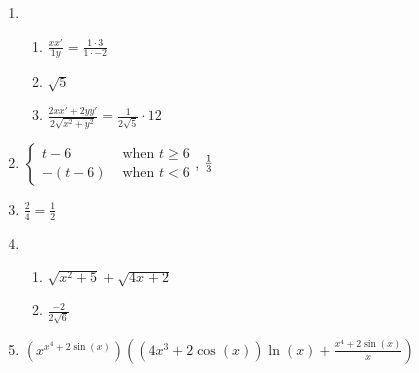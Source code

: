 \documentclass[12pt,twoside]{article}
\makeatletter
\def\emptycleardoublepage{\clearpage\if@twoside \ifodd\c@page\else
\thispagestyle{empty}%
\hbox{}\newpage\if@twocolumn\hbox{}\newpage\fi\fi\fi}
\makeatother
\begin{document}
\begin{multicols}{2}
\begin{enumerate}
\def \b{1}\def \x{1}\def \y{-2}\def \xchange{3}\def \ratrhs{-2}\def \cirrhs{5}\def \hyprhs{-3}\def \compy{y^{2}}\def \ychangenum{-6}\def \dist{5}\def \fracrat{-18}\def \fraccirc{0}\def \frachyp{12}
\item \begin{enumerate}
\item $\frac{xx'}{\b y} = \frac{\x \cdot \xchange}{\b \cdot \y}$
\item $\sqrt{\dist}$
\item $\frac{2xx'+2yy'}{2\sqrt{x^2+y^2}} = \frac{1}{2\sqrt{\dist}} \cdot \frachyp$
\end{enumerate}
\def \a{6}\def \k{3}\def \abstop{0}\def \ktop{0}
\item $\begin{cases} t-\a & \text{ when } t \geq \a \\ -(t- \a) & \text{ when } t < \a \end{cases}$, $\ifthenelse{\ktop=1}{\k}{\frac{1}{\k}}$
\def \a{5}\def \b{3}\def \k{4}\def \fancyp{x^{2}-8x^{}+15}\def \simplep{4x^{}-20}\def \fancyreduced{2}\def \niceanstop{\frac{1}{2}}\def \niceansbottom{2}
\item $\frac{\fancyreduced}{\k} = \niceanstop$
\def \a{1}\def \b{3}\def \ab{3}\def \c{5}\def \amb{-2}\def \ansroot{6}\def \firstroot{x^{2}+5}\def \secondroot{4x^{}+2}\def \porm{-1}
\item \begin{enumerate}
\item $\sqrt{\firstroot} + \sqrt{\secondroot}$
\item $\frac{\amb}{2\sqrt{\ansroot}}$
\end{enumerate}
\def \varexp{4}\def \newexp{3}\def \trigcoeff{2}\def \trigval{+2}\def \oppval{-2}
\item $(x^{x^\varexp \trigval \sin(x)}) \left( (\varexp x^{\newexp} \trigval \cos(x))\ln(x) + \frac{x^\varexp \trigval \sin(x)}{x} \right)$
 \end{enumerate}\end{multicols}\emptycleardoublepage 
\end{document}

